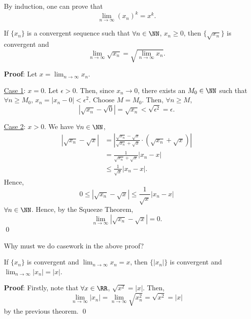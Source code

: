 \begin{remark}
By induction, one can prove that 
\[
\lim_{n\to \infty}(x_n)^k = x^k.
\]
\end{remark}

\begin{theorem}
If $\{x_n\}$ is a convergent sequence such that $\forall n\in\NN$, $x_n\geq 0$, then $\{\sqrt{x_n}\}$ is convergent and \[
\lim_{n\to \infty} \sqrt{x_n} = \sqrt{\lim_{n\to \infty}x_n}.
\]
\end{theorem}
\textbf{Proof}: Let $x = \lim_{n\to \infty} x_n$. 

\underline{Case 1}: $x=0$. Let $\epsilon>0$. Then, since $x_n\to 0$, there exists an $M_0 \in\NN$ such that $\forall n\geq M_0$, $x_n = |x_n-0| <\epsilon^2$. Choose $M = M_0$. Then, $\forall n\geq M$, 
\[
|\sqrt{x_n} - \sqrt{0}| = \sqrt{x_n} < \sqrt{\epsilon^2} = \epsilon.
\]

\underline{Case 2}: $x>0$. We have $\forall n\in\NN$,
\begin{align*}
    |\sqrt{x_n} - \sqrt{x}| &= \left|\frac{\sqrt{x_n} - \sqrt x} {\sqrt{x_n} + \sqrt x}\cdot (\sqrt{x_n} + \sqrt{x})\right| \\
    &= \frac{1}{\sqrt{x_n}+\sqrt{x}} |x_n -x| \\ 
    &\leq \frac{1}{\sqrt x} |x_n -x|.
\end{align*}
Hence,
\[
0 \leq  |\sqrt{x_n} - \sqrt{x}|\leq \frac{1}{\sqrt x} |x_n -x|
\]
$\forall n\in\NN$. Hence, by the Squeeze Theorem,
\[
\lim_{n\to \infty} |\sqrt{x_n}
 - \sqrt x| = 0.\] 
 \qed 
 
 \begin{remark}
 Why must we do casework in the above proof?
 \end{remark}
 
 \begin{theorem}
 If $\{x_n\}$ is convergent and $\lim_{n\to \infty} x_n = x$, then $\{|x_n|\}$ is convergent and $\lim_{n\to \infty} |x_n| = |x|$.
 \end{theorem}
 \textbf{Proof}:
 Firstly, note that $\forall x\in\RR$, $\sqrt{x^2} = |x|$. Then,
 \[
 \lim_{n\to \infty}|x_n| =  \lim_{n\to \infty}\sqrt{x_n^2}= \sqrt{x^2} = |x|
 \]
 by the previous theorem. \qed 
 

